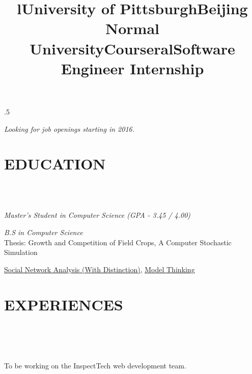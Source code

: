 \begin{resume}

\moveleft.5\hoffset\centerline{\emph{Looking for job openings starting in 2016.}}

\section{\textsc{EDUCATION}}
\begin{formatb}
  \title{l}\\
   \body\\
\end{formatb}

\title{\textbf{University of Pittsburgh}}
\begin{position}
	{\sl Master's Student in Computer Science (GPA - 3.45 / 4.00)}
\end{position}

\title{\textbf{Beijing Normal University}}
\begin{position}
 	{\sl B.S in Computer Science}\\
    Thesis: Growth and Competition of Field Crops, A Computer Stochastic Simulation
\end{position}

\title{\textbf{Coursera}}
\begin{position}
    \href{http://qiaozhang-wordpress.stor.sinaapp.com/uploads/2012/11/SNAcertificate.pdf}{Social Network Analysis (With Distinction)}, \href{http://qiaozhang-wordpress.stor.sinaapp.com/uploads/2012/09/ModelCert.pdf}{Model Thinking}
\end{position}



\section{\textsc{EXPERIENCES}}
\begin{formatb}
	\title{l}\\
	\\
	\body\\
\end{formatb}


\title{\textbf{Software Engineer Internship}}
\begin{position}
	To be working on the InspectTech web development team.
\end{position}



\end{resume}
